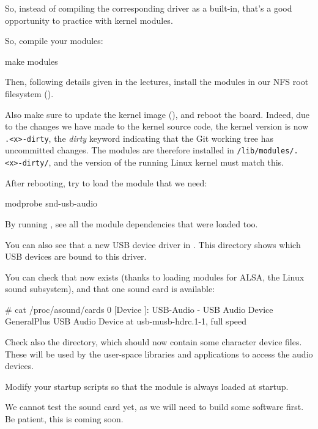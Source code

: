 {So, instead of compiling the corresponding driver as a built-in, that's
a good opportunity to practice with kernel modules.

So, compile your modules:
\begin{bashinput}
make modules
\end{bashinput}

Then, following details given in the lectures, install the modules in our NFS
root filesystem ().

Also make sure to update the kernel image (), and reboot the
board.  Indeed, due to the changes we have made to the kernel source code,
the kernel version is now {\tt \workingkernel.<x>-dirty}, the {\em dirty}
keyword indicating that the Git working tree has uncommitted changes.
The modules are therefore installed in {\tt /lib/modules/\workingkernel.<x>-dirty/},
and the version of the running Linux kernel must match this.

After rebooting, try to load the module that we need:

\begin{bashinput}
modprobe snd-usb-audio
\end{bashinput}

By running , see all the module dependencies that
were loaded too.

You can also see that a new USB device driver in
. This directory shows which
USB devices are bound to this driver.

You can check that  now exists (thanks to loading
modules for ALSA, the Linux sound subsystem), and that one sound
card is available:

\begin{bashinput}
# cat /proc/asound/cards
 0 [Device         ]: USB-Audio - USB Audio Device
                      GeneralPlus USB Audio Device at usb-musb-hdrc.1-1, full speed
\end{bashinput}

Check also the  directory, which should now contain
some character device files. These will be used by the user-space
libraries and applications to access the audio devices.

Modify your startup scripts so that the  module
is always loaded at startup.

We cannot test the sound card yet, as we will need to build some
software first. Be patient, this is coming soon.

}
